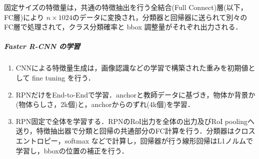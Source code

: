 \documentclass[twocolumn]{jsarticle} %
\begin{document}
固定サイズの特徴量は，共通の特徴抽出を行う全結合(Full Connect)層(以下，FC層)により $n{\times}1024$のデータに変換され，分類器と回帰器に送られて別々のFC層で処理されて，クラス分類確率と bbox 調整量がそれぞれ出力される．

\subparagraph{Faster R-CNN の学習} 
\begin{enumerate}
    \item CNNによる特徴量生成は，画像認識などの学習で構築された重みを初期値として fine tuning を行う．
    \item RPNだけをEnd-to-Endで学習．anchorと教師データに基づき，物体か背景か(物体らしさ，2k個)と，anchorからのずれ(4k個)を学習．
    \item RPN固定で全体を学習する．RPNのRoI出力を全体の出力及びRoI poolingへ送り，特徴抽出器で分類と回帰の共通部分のFC計算を行う．分類器はクロスエントロピー，softmax などで計算し，回帰器が行う線形回帰はL1ノルムで学習し，bboxの位置の補正を行う．
\end{enumerate}

\end{document}
